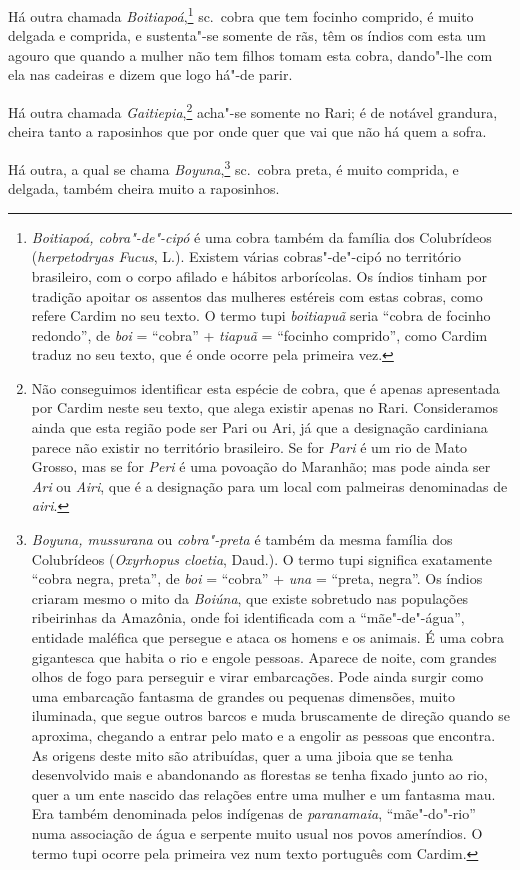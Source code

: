  Há outra chamada \textit{Boitiapoá},\footnote{ \textit{Boitiapoá,
cobra"-de"-cipó} é uma cobra também da família dos Colubrídeos 
(\textit{herpetodryas Fucus}, L.). Existem várias cobras"-de"-cipó no
território brasileiro, com o corpo afilado e hábitos arborícolas. Os
índios tinham por tradição apoitar os assentos das mulheres estéreis
com estas cobras, como refere Cardim no seu texto. O termo tupi
\textit{boitiapuã} seria ``cobra de focinho redondo'', de \textit{boi} 
= ``cobra'' + \textit{tiapuã} = ``focinho comprido'', como Cardim traduz no
seu texto, que é onde ocorre pela primeira vez.} sc.~cobra que tem
focinho comprido, é muito delgada e comprida, e sustenta"-se somente de
rãs, têm os índios com esta um agouro que quando a mulher não tem
filhos tomam esta cobra, dando"-lhe com ela nas cadeiras e dizem que logo há"-de parir.

 Há outra chamada \textit{Gaitiepia},\footnote{ Não conseguimos
identificar esta espécie de cobra, que é apenas apresentada por Cardim
neste seu texto, que alega existir apenas no Rari. Consideramos ainda
que esta região pode ser Pari ou Ari, já que a designação cardiniana
parece não existir no território brasileiro. Se for \textit{Pari} é um
rio de Mato Grosso, mas se for \textit{Peri} é uma povoação do
Maranhão; mas pode ainda ser \textit{Ari} ou \textit{Airi}, 
que é a designação para um local com palmeiras denominadas de
\textit{airi}.} acha"-se somente no Rari; é de notável grandura,
cheira tanto a raposinhos que por onde quer que vai que não há quem a sofra.

 Há outra, a qual se chama \textit{Boyuna},\footnote{ \textit{Boyuna,
mussurana} ou \textit{cobra"-preta} é também da mesma família dos
Colubrídeos (\textit{Oxyrhopus cloetia}, Daud.). O termo tupi significa
exatamente ``cobra negra, preta'', de \textit{boi} = ``cobra'' +
\textit{una} = ``preta, negra''. Os índios criaram mesmo o mito da
\textit{Boiúna}, que existe sobretudo nas populações ribeirinhas da
Amazônia, onde foi identificada com a ``mãe"-de"-água'', entidade maléfica
que persegue e ataca os homens e os animais. É uma cobra gigantesca que
habita o rio e engole pessoas. Aparece de noite, com grandes olhos de
fogo para perseguir e virar embarcações. Pode ainda surgir como uma
embarcação fantasma de grandes ou pequenas dimensões, muito iluminada,
que segue outros barcos e muda bruscamente de direção quando se
aproxima, chegando a entrar pelo mato e a engolir as pessoas que
encontra. As origens deste mito são atribuídas, quer a uma jiboia que
se tenha desenvolvido mais e abandonando as florestas se tenha fixado
junto ao rio, quer a um ente nascido das relações entre uma mulher e um
fantasma mau. Era também denominada pelos indígenas de
\textit{paranamaia}, ``mãe"-do"-rio'' numa associação de água e serpente
muito usual nos povos ameríndios. O termo tupi ocorre pela primeira vez
num texto português com Cardim.} sc.~cobra preta, é muito comprida, e
delgada, também cheira muito a raposinhos.

